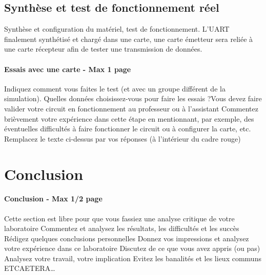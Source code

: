 \documentclass[a4paper]{article} %
\begin{document}
 \subsection{Synthèse et test de fonctionnement réel}
Synthèse et configuration du matériel, test de fonctionnement.
L’UART finalement synthétisé et chargé dans une carte, une carte émetteur sera reliée à une carte récepteur afin de tester une transmission de données.
\begin{tcolorbox}[colframe=Monokaimagenta,colback=white]
\paragraph{Essais avec une carte - Max 1 page}
Indiquez comment vous faites le test (et avec un groupe différent de la simulation). Quelles données choisissez-vous pour faire les essais ?Vous devez faire valider votre circuit en fonctionnement au professeur ou à l’assistant
Commentez brièvement votre expérience dans cette étape en mentionnant, par exemple, des éventuelles difficultés à faire fonctionner le circuit ou à configurer la carte, etc.
Remplacez le texte ci-dessus par vos réponses (à l’intérieur du cadre rouge)
\\
\end{tcolorbox}
\section {Conclusion}
\begin{tcolorbox}[colframe=Monokaimagenta,colback=white]
\paragraph{Conclusion - Max 1/2 page}
Cette section est libre pour que vous fassiez une analyse critique de votre laboratoire
Commentez et analysez 
les résultats, 
les difficultés et les succès
Rédigez quelques conclusions personnelles
Donnez vos impressions et analysez votre expérience dans ce laboratoire
Discutez de ce que vous avez appris (ou pas)
Analysez votre travail, votre implication
Evitez les banalités et les lieux communs
ETCAETERA…
\\
\end{tcolorbox}
\end{document}
